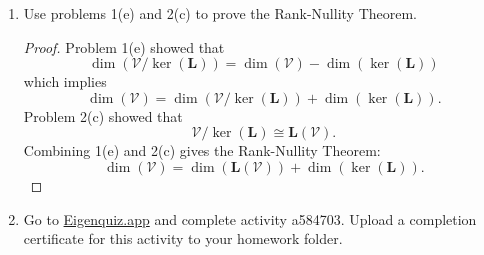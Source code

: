 \documentclass[12pt]{amsart}
\newcommand{\1}{\mathbbm{1}}
\newcounter{Theorem}
\numberwithin{equation}{section}
\numberwithin{Theorem}{section}
\theoremstyle{plain} %
\theoremstyle{definition}
\theoremstyle{remark}
\begin{document}
\begin{enumerate}[1.]
\begin{enumerate}[(a)]
\item Show that \(\mathbf{\Phi}: \mathcal{V}/\operatorname{ker}(\mathbf{L})\to\mathbf{L}(\mathcal{V})\) is an isomorphism.

\bigskip

\begin{proof}
Let \(\mathbf{x}_1,\mathbf{x}_2\in\mathcal{V}/\ker(\mathbf{L})\)
and $\mathbf{v},\mathbf{v}_1,\mathbf{v}_2\in\mathcal{V}$ 
and \(\mathbf{w}\in\ker(\mathbf{L})\) be arbitrary.
Surjectivity can be shown by
\[
\mathbf{L}(\mathbf{v})
= \mathbf{L}(\mathbf{v}) + \mathbf{L}(\mathbf{w})
= \mathbf{L}(\mathbf{v}+\mathbf{w})
= \mathbf{Phi}(\mathbf{v}+\mathbf{w})
= \mathbf{Phi}([\mathbf{v}])
= \mathbf{Phi}([\mathbf{x}])
\in \mathbf{Phi}(\mathcal{V}/\ker(\mathbf{L})
.\]
Injectivity can be shown by considering
\[\mathbf{L}(\mathbf{v}_1) = \mathbf{L}(\mathbf{v}_2)\]
or
\[\mathbf{L}(\mathbf{v}_1+\mathbf{v}_2) = \mathbf{0}.\]
Which shows
\[\mathbf{v}_1+\mathbf{v}_2\in\ker(\mathbf{L}).\]
Problem 1(a) showed that when this is the case then
\[
[\mathbf{v}_1]=[\mathbf{v}_2] \text{ and } \mathbf{x}_1=\mathbf{x}_2.
\]
Thus, $\mathbf{\Phi}$ is an isomorphism.
\end{proof}

\clearpage

\end{enumerate}

\item Use problems 1(e) and 2(c) to prove the Rank-Nullity Theorem.

\bigskip

\begin{proof}
Problem 1(e) showed that
\[
\operatorname{dim}(\mathcal{V}/\operatorname{ker}(\mathbf{L})) 
	= \operatorname{dim}(\mathcal{V}) - \operatorname{dim}(\operatorname{ker}(\mathbf{L}))
\]
which implies
\[
\operatorname{dim}(\mathcal{V})
	= \operatorname{dim}(\mathcal{V}/\operatorname{ker}(\mathbf{L})) + \operatorname{dim}(\operatorname{ker}(\mathbf{L}))
.\]
Problem 2(c) showed that
\[
\mathcal{V}/\operatorname{ker}(\mathbf{L}) \cong \mathbf{L}(\mathbf{\mathcal{V}})
.\]
Combining 1(e) and 2(c) gives the Rank-Nullity Theorem:
\[
\operatorname{dim}(\mathcal{V})
	= \operatorname{dim}(\mathbf{L}(\mathbf{\mathcal{V}})) + \operatorname{dim}(\operatorname{ker}(\mathbf{L}))
.\]
\end{proof}

\vspace*{\fill}

\item Go to \href{https://eigenquiz.app/}{Eigenquiz.app} and complete activity a584703. Upload a completion certificate for this activity to your homework folder.

\end{enumerate}
\end{document}
